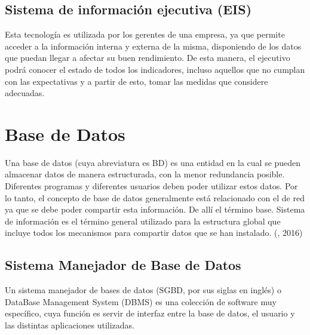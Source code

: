 


\setlength{\parskip}{0mm}

\subsection{Sistema de información ejecutiva (EIS)}
\setlength{\parskip}{5mm}
 Esta tecnología es utilizada por los gerentes de una empresa, ya que permite acceder a la información interna y externa de la misma, disponiendo de los datos que puedan llegar a afectar su buen rendimiento.
De esta manera, el ejecutivo podrá conocer el estado de todos los indicadores, incluso aquellos que no cumplan con las expectativas y a partir de esto, tomar las medidas que considere adecuadas.
\setlength{\parskip}{0mm}




\section{Base de Datos} 	
\setlength{\parskip}{5mm}
Una base de datos (cuya abreviatura es BD) es una entidad en la cual se pueden almacenar datos de manera estructurada, con la menor redundancia posible. Diferentes programas y diferentes usuarios deben poder utilizar estos datos. Por lo tanto, el concepto de base de datos generalmente está relacionado con el de red ya que se debe poder compartir esta información. De allí el término base. Sistema de información es el término general utilizado para la estructura global que incluye todos los mecanismos para compartir datos que se han instalado. (\citet{bdbib}, 2016) 


\setlength{\parskip}{0mm}



\subsection{Sistema Manejador de Base de Datos}
\setlength{\parskip}{5mm}
Un sistema manejador de bases de datos (SGBD, por sus siglas en inglés) o DataBase Management System (DBMS) es una colección de software muy específico, cuya función es servir de interfaz entre la base de datos, el usuario y las distintas aplicaciones utilizadas.


